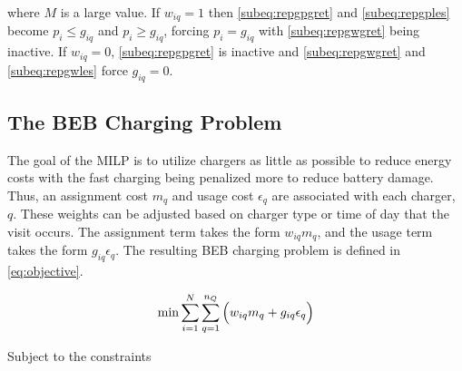 \noindent
where $M$ is a large value. If $w_{iq} = 1$ then \autoref{subeq:repgpgret} and \autoref{subeq:repgples} become $p_i \leq
g_{iq}$ and $p_i \geq g_{iq}$, forcing $p_i = g_{iq}$ with \autoref{subeq:repgwgret} being inactive. If $w_{iq} = 0$,
\autoref{subeq:repgpgret} is inactive and \autoref{subeq:repgwgret} and \autoref{subeq:repgwles} force $g_{iq} = 0$.

\subsection{The BEB Charging Problem} \label{sec:BEB_MILP}
The goal of the MILP is to utilize chargers as little as possible to reduce energy costs with the fast charging being
penalized more to reduce battery damage. Thus, an assignment cost $m_q$ and usage cost $\epsilon_q$ are associated with each
charger, $q$. These weights can be adjusted based on charger type or time of day that the visit occurs. The assignment
term takes the form $w_{iq}m_q$, and the usage term takes the form $g_{iq} \epsilon_q$. The resulting BEB charging problem is
defined in \autoref{eq:objective}.

\begin{equation}
\label{eq:objective}
	\min \sum_{i=1}^N \sum_{q=1}^{n_Q} \Big( w_{iq} m_q + g_{iq} \epsilon_q \Big) \\
\end{equation}

Subject to the constraints

